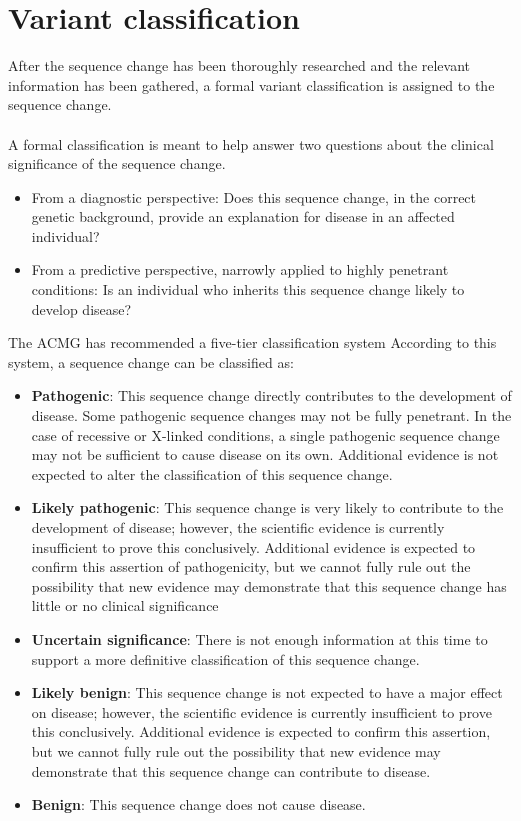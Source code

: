 \documentclass[9pt,a4paper]{article}
\begin{document}
\section*{{\color{invitae}Variant classification \leaders\vrule height 2.5pt depth -1.5pt \hfill \null}}

After the sequence change has been thoroughly researched and the relevant information has been gathered, a formal variant classification is assigned to the sequence change. \\ \\
A formal classification is meant to help answer two questions about the clinical significance of the sequence change. \\
\begin{itemize}[leftmargin=0.4cm]
 \item From a diagnostic perspective: Does this sequence change, in the correct genetic background, provide an explanation for disease
in an affected individual? 
 \item From a predictive perspective, narrowly applied to highly penetrant conditions: Is an individual who inherits this sequence
change likely to develop disease?
\end{itemize}	

The ACMG has recommended a five-tier classification system According to this system, a sequence change can be classified as:

\begin{itemize}[leftmargin=0.4cm]
	\item \textbf{Pathogenic}: This sequence change directly contributes to the development of disease. Some pathogenic sequence changes may not be fully penetrant. In the case of recessive or X-linked conditions, a single pathogenic sequence change may not be sufficient to cause disease on its own. Additional evidence is not expected to alter the classification of this sequence change.
	\item \textbf{Likely pathogenic}: This sequence change is very likely to contribute to the development of disease; however, the scientific evidence is currently insufficient to prove this conclusively. Additional evidence is expected to confirm this assertion of pathogenicity, but
we cannot fully rule out the possibility that new evidence may demonstrate that this sequence change has little or no clinical
significance
	\item \textbf{Uncertain significance}: There is not enough information at this time to support a more definitive classification of this sequence change.
	\item \textbf{Likely benign}: This sequence change is not expected to have a major effect on disease; however, the scientific evidence is currently insufficient to prove this conclusively. Additional evidence is expected to confirm this assertion, but we cannot fully rule out the
possibility that new evidence may demonstrate that this sequence change can contribute to disease.
	\item \textbf{Benign}: This sequence change does not cause disease. 
\end{itemize}	
\end{document}
